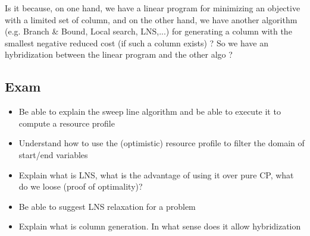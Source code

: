 Is it because, on one hand, we have a linear program for minimizing an
objective with a limited set of column, and on the other hand, we have
another algorithm (e.g. Branch \& Bound, Local search, LNS,...) for
generating a column with the smallest negative reduced cost (if such a
column exists) ?
So we have an hybridization between the linear program and the other
algo ?


\subsection{Exam}
\begin{itemize}
    \item  Be able to explain the sweep line algorithm and be
        able to execute it to compute a resource profile
    \item  Understand how to use the (optimistic) resource profile
        to filter the domain of start/end variables
    \item  Explain what is LNS, what is the advantage of using it
        over pure CP, what do we loose (proof of optimality)?
    \item  Be able to suggest LNS relaxation for a problem
    \item  Explain what is column generation. In what sense does
        it allow hybridization
\end{itemize}
